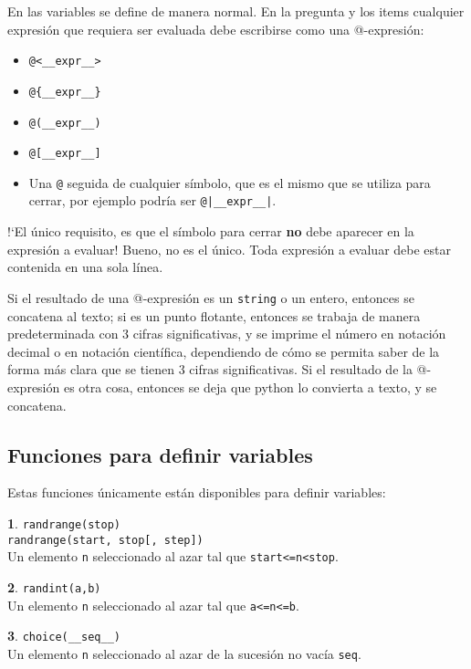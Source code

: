 \documentclass[12pt]{article}
\theoremstyle{definition}
\newtheorem{funcion}{}[section]
\begin{document}
En las variables se define de manera normal. En la pregunta y los items cualquier expresión que requiera ser evaluada debe escribirse como una @-expresión:
\begin{itemize}
  \item \verb|@<__expr__>|
  \item \verb|@{__expr__}|
  \item \verb|@(__expr__)|
  \item \verb|@[__expr__]|
  \item Una \verb|@| seguida de cualquier símbolo, que es el mismo que se utiliza para cerrar, por ejemplo podría ser \verb/@|__expr__|/. 
\end{itemize}

!`El único requisito, es que el símbolo para cerrar \textbf{no} debe aparecer en la expresión a evaluar! Bueno, no es el único. Toda expresión a evaluar debe estar contenida en una sola línea.

Si el resultado de una @-expresión es un \verb|string| o un entero, entonces se concatena al texto; si es un punto flotante, entonces se trabaja de manera predeterminada con 3 cifras significativas, y se imprime el número en notación decimal o en notación científica, dependiendo de cómo se permita saber de la forma más clara que se tienen 3 cifras significativas. Si el resultado de la @-expresión es otra cosa, entonces se deja que python lo convierta a texto, y se concatena.

\subsection{Funciones para definir variables}

Estas funciones únicamente están disponibles para definir variables:

\begin{funcion}
  \verb|randrange(stop)| \\
  \verb|randrange(start, stop[, step])| \\[1ex]
  Un elemento \verb|n| seleccionado al azar tal que \verb|start<=n<stop|.
\end{funcion}

\begin{funcion}
  \verb|randint(a,b)| \\[1ex]
  Un elemento \verb|n| seleccionado al azar tal que \verb|a<=n<=b|.
\end{funcion}

\begin{funcion}
  \verb|choice(__seq__)| \\[1ex]
  Un elemento \verb|n| seleccionado al azar de la sucesión no vacía \verb|seq|.
\end{funcion}
\end{document}
